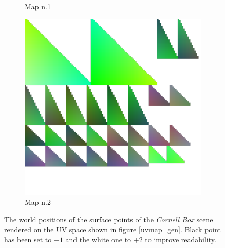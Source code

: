 \begin{figure}
\begin{subfigure}[t]{0.24\linewidth}
		\caption{Map n.1}
	\end{subfigure}
	\begin{subfigure}[t]{0.24\linewidth}
		\includegraphics[width=\textwidth]{chapters/chapter_thetool/uvworld2}
		\caption{Map n.2}
	\end{subfigure}

	\caption{The world positions of the surface points of the \textit{Cornell Box} scene rendered on the UV space shown in figure \ref{uvmap_gen}. Black point has been set to $-1$ and the white one to $+2$ to improve readability.}
	\label{uvworld}
\end{figure}

